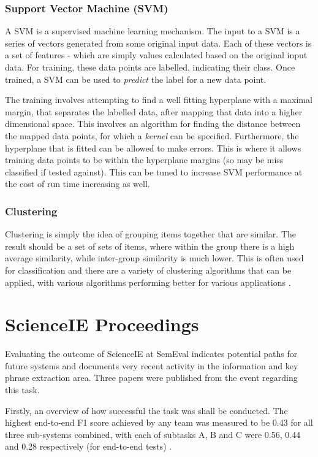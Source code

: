 \subsubsection*{Support Vector Machine (SVM)}
A SVM is a supervised machine learning mechanism. The input to a SVM is a series of vectors generated from some original input data. Each of these vectors is a set of features - which are simply values calculated based on the original input data. For training, these data points are labelled, indicating their class. Once trained, a SVM can be used to \textit{predict} the label for a new data point.

The training involves attempting to find a well fitting hyperplane with a maximal margin, that separates the labelled data, after mapping that data into a higher dimensional space. This involves an algorithm for finding the distance between the mapped data points, for which a \textit{kernel} can be specified. Furthermore, the hyperplane that is fitted can be allowed to make errors. This is where it allows training data points to be within the hyperplane margins (so may be miss classified if tested against). This can be tuned to increase SVM performance at the cost of run time increasing as well.

\subsubsection*{Clustering}
Clustering is simply the idea of grouping items together that are similar. The result should be a set of sets of items, where within the group there is a high average similarity, while inter-group similarity is much lower. This is often used for classification and there are a variety of clustering algorithms that can be applied, with various algorithms performing better for various applications \cite{Rai2010}.

\section{ScienceIE Proceedings}
Evaluating the outcome of ScienceIE at SemEval indicates potential paths for future systems and documents very recent activity in the information and key phrase extraction area. Three papers were published from the event regarding this task.

Firstly, an overview of how successful the task was shall be conducted. The highest end-to-end F1 score achieved by any team was measured to be 0.43 for all three sub-systems combined, with each of subtasks A, B and C were 0.56, 0.44 and 0.28 respectively (for end-to-end tests) \cite{Augenstein2017}. 

